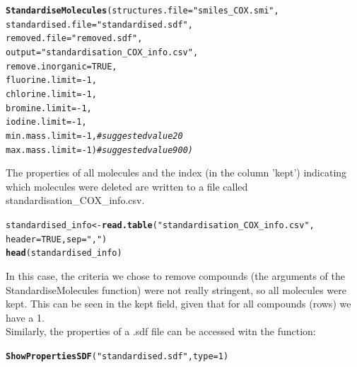 \documentclass[twoside,a4wide,12pt]{article}\usepackage[]{graphicx}\usepackage[]{color}
\makeatletter
\newcommand{\hlnum}[1]{\textcolor[rgb]{0.686,0.059,0.569}{#1}}%
\newcommand{\hlstr}[1]{\textcolor[rgb]{0.192,0.494,0.8}{#1}}%
\newcommand{\hlcom}[1]{\textcolor[rgb]{0.678,0.584,0.686}{\textit{#1}}}%
\newcommand{\hlopt}[1]{\textcolor[rgb]{0,0,0}{#1}}%
\newcommand{\hlstd}[1]{\textcolor[rgb]{0.345,0.345,0.345}{#1}}%
\newcommand{\hlkwb}[1]{\textcolor[rgb]{0.69,0.353,0.396}{#1}}%
\newcommand{\hlkwc}[1]{\textcolor[rgb]{0.333,0.667,0.333}{#1}}%
\newcommand{\hlkwd}[1]{\textcolor[rgb]{0.737,0.353,0.396}{\textbf{#1}}}%
\newenvironment{kframe}{%
 \def\at@end@of@kframe{}%
 \ifinner\ifhmode%
  \def\at@end@of@kframe{\end{minipage}}%
  \begin{minipage}{\columnwidth}%
 \fi\fi%
 \def\FrameCommand##1{\hskip\@totalleftmargin \hskip-\fboxsep
 \colorbox{shadecolor}{##1}\hskip-\fboxsep
     \hskip-\linewidth \hskip-\@totalleftmargin \hskip\columnwidth}%
 \MakeFramed {\advance\hsize-\width
   \@totalleftmargin\z@ \linewidth\hsize
   \@setminipage}}%
 {\par\unskip\endMakeFramed%
 \at@end@of@kframe}
\newenvironment{knitrout}{}{} %
\makeatother
\begin{document}
\begin{knitrout}
\color{fgcolor}\begin{kframe}
\begin{alltt}
\hlkwd{StandardiseMolecules}\hlstd{(}\hlkwc{structures.file}\hlstd{=}\hlstr{"smiles_COX.smi"}\hlstd{,}
\hlkwc{standardised.file}\hlstd{=}\hlstr{"standardised.sdf"}\hlstd{,}
\hlkwc{removed.file}\hlstd{=}\hlstr{"removed.sdf"}\hlstd{,}
\hlkwc{output}\hlstd{=}\hlstr{"standardisation_COX_info.csv"}\hlstd{,}
\hlkwc{remove.inorganic}\hlstd{=}\hlnum{TRUE}\hlstd{,}
\hlkwc{fluorine.limit}\hlstd{=}\hlopt{-}\hlnum{1}\hlstd{,}
\hlkwc{chlorine.limit}\hlstd{=}\hlopt{-}\hlnum{1}\hlstd{,}
\hlkwc{bromine.limit}\hlstd{=}\hlopt{-}\hlnum{1}\hlstd{,}
\hlkwc{iodine.limit}\hlstd{=}\hlopt{-}\hlnum{1}\hlstd{,}
\hlkwc{min.mass.limit}\hlstd{=}\hlopt{-}\hlnum{1}\hlstd{,} \hlcom{#suggested value 20}
\hlkwc{max.mass.limit}\hlstd{=}\hlopt{-}\hlnum{1}\hlstd{)}\hlcom{#suggested value  900)}
\end{alltt}
\end{kframe}
\end{knitrout}

The properties of all molecules and the index (in the column 'kept') indicating which molecules were deleted are written to a file called standardisation\_COX\_info.csv.

\begin{knitrout}
\color{fgcolor}\begin{kframe}
\begin{alltt}
\hlstd{standardised_info} \hlkwb{<-} \hlkwd{read.table}\hlstd{(}\hlstr{"standardisation_COX_info.csv"}\hlstd{,}
    \hlkwc{header} \hlstd{=} \hlnum{TRUE}\hlstd{,} \hlkwc{sep} \hlstd{=} \hlstr{","}\hlstd{)}
\hlkwd{head}\hlstd{(standardised_info)}
\end{alltt}
\end{kframe}
\end{knitrout}


In this case, the criteria we chose to remove compounds (the arguments of the StandardiseMolecules function) were not really stringent, so all molecules were kept. This can be seen in the kept field, given that for all compounds (rows) we have a 1.\\
Similarly, the properties of a .sdf file can be accessed witn the function:
\begin{knitrout}
\color{fgcolor}\begin{kframe}
\begin{alltt}
\hlkwd{ShowPropertiesSDF}\hlstd{(}\hlstr{"standardised.sdf"}\hlstd{,} \hlkwc{type} \hlstd{=} \hlnum{1}\hlstd{)}
\end{alltt}
\end{kframe}
\end{knitrout}
\end{document}

